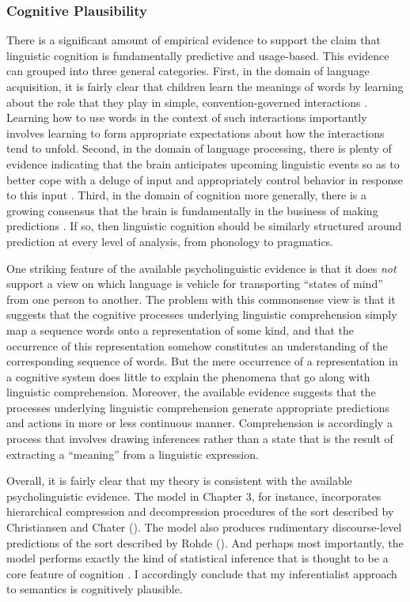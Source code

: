 \subsubsection{Cognitive Plausibility}

There is a significant amount of empirical evidence to support the claim that linguistic cognition is fundamentally predictive and usage-based. This evidence can grouped into three general categories. First, in the domain of language acquisition, it is fairly clear that children learn the meanings of words by learning about the role that they play in simple, convention-governed interactions \citep{Tomasello:2005,Tomasello:2001}. Learning how to use words in the context of such interactions importantly involves learning to form appropriate expectations about how the interactions tend to unfold. Second, in the domain of language processing, there is plenty of evidence indicating that the brain anticipates upcoming linguistic events so as to better cope with a deluge of input and appropriately control behavior in response to this input \citep{Christiansen:2015,Pickering:2007,Pickering:2013}. Third, in the domain of cognition more generally, there is a growing consensus that the brain is fundamentally in the business of making predictions \citep{clark:2013}. If so, then linguistic cognition should be similarly structured around prediction at every level of analysis, from phonology to pragmatics. 

One striking feature of the available psycholinguistic evidence is that it does \textit{not} support a view on which language is vehicle for transporting ``states of mind'' from one person to another. The problem with this commonsense view is that it suggests that the cognitive processes underlying linguistic comprehension simply map a sequence words onto a representation of some kind, and that the occurrence of this representation somehow constitutes an understanding of the corresponding sequence of words. But the mere occurrence of a representation in a cognitive system does little to explain the phenomena that go along with linguistic comprehension. Moreover, the available evidence suggests that the processes underlying linguistic comprehension generate appropriate predictions and actions in more or less continuous manner. Comprehension is accordingly a process that involves drawing inferences rather than a state that is the result of extracting a ``meaning'' from a linguistic expression.

Overall, it is fairly clear that my theory is consistent with the available psycholinguistic evidence. The model in Chapter 3, for instance, incorporates hierarchical compression and decompression procedures of the sort described by Christiansen and Chater (\citeyear{Christiansen:2015}). The model also produces rudimentary discourse-level predictions of the sort described by Rohde (\citeyear{Rohde:2008}). And perhaps most importantly, the model performs exactly the kind of statistical inference that is thought to be a core feature of cognition \citep{Eliasmith:2007,clark:2013}. I accordingly conclude that my inferentialist approach to semantics is cognitively plausible.  

